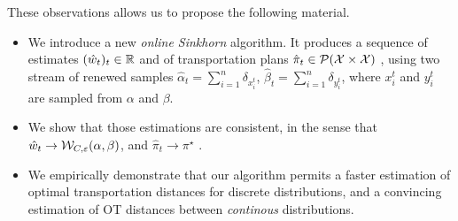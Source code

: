 These observations allows us to propose the following
material.
\begin{itemize}
    \item We introduce a new \textit{online Sinkhorn} algorithm. It produces a sequence of
    estimates $(\hat w_t)_t \in \mathbb{R}$ and of transportation plans $\hat \pi_t \in
    \mathcal{P}(\mathcal{X} \times \mathcal{X})$ , using two stream of renewed samples $\hat \alpha_t =
    \sum_{i=1}^n \delta_{x^t_i}$, $\hat \beta_t = \sum_{i=1}^n \delta_{y^t_i}$,
    where $x^t_i$ and $y^t_i$ are sampled from $\alpha$ and $\beta$.
    \item We show that those estimations are consistent, in the sense that $\hat
    w_t \to \mathcal{W}_{C,\varepsilon}(\alpha, \beta)$, and $\hat \pi_t \to \pi^\star$ .
    \item We empirically demonstrate that our algorithm permits a faster
    estimation of optimal transportation distances for discrete distributions,
    and a convincing estimation of OT distances between \textit{continous} distributions.
\end{itemize}

